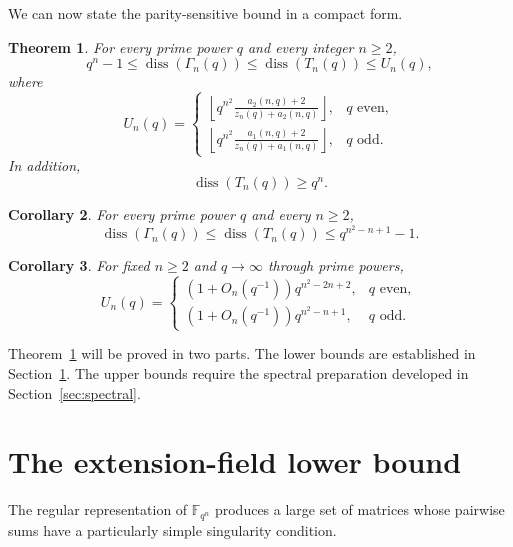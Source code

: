 \documentclass[11pt]{article}
\newtheorem{theorem}{Theorem}[section]
\newtheorem{corollary}[theorem]{Corollary}
\theoremstyle{definition}
\DeclareMathOperator{\diss}{diss}
\newcommand{\F}{\mathbb{F}}
\begin{document}

We can now state the parity-sensitive bound in a compact form.

\begin{theorem}\label{thm:main}
For every prime power $q$ and every integer $n\ge2$,
\[
  q^n-1\leq\diss(\Gamma_n(q))\leq\diss(T_n(q))\leq U_n(q),
\]
where
\begin{equation}\label{eq:U-definition}
U_n(q)=
\begin{cases}
\displaystyle
\left\lfloor q^{n^2}
\frac{a_2(n,q)+2}{z_n(q)+a_2(n,q)}\right\rfloor,
&q\text{ even},\\[1.2em]
\displaystyle
\left\lfloor q^{n^2}
\frac{a_1(n,q)+2}{z_n(q)+a_1(n,q)}\right\rfloor,
&q\text{ odd}.
\end{cases}
\end{equation}
In addition,
\[
  \diss(T_n(q))\ge q^n.
\]
\end{theorem}

\begin{corollary}\label{cor:uniform}
For every prime power $q$ and every $n\ge2$,
\[
  \diss(\Gamma_n(q))\le\diss(T_n(q))
  \le q^{n^2-n+1}-1.
\]
\end{corollary}

\begin{corollary}\label{cor:asymptotic}
For fixed $n\ge2$ and $q\to\infty$ through prime powers,
\[
 U_n(q)=
 \begin{cases}
 (1+O_n(q^{-1}))q^{n^2-2n+2},&q\text{ even},\\
 (1+O_n(q^{-1}))q^{n^2-n+1},&q\text{ odd}.
 \end{cases}
\]
\end{corollary}

Theorem~\ref{thm:main} will be proved in two parts.  The lower bounds are
established in Section~\ref{sec:lower}.  The upper bounds require the
spectral preparation developed in Section~\ref{sec:spectral}.

\section{The extension-field lower bound}\label{sec:lower}

The regular representation of $\F_{q^n}$ produces a large set of matrices
whose pairwise sums have a particularly simple singularity condition.
\end{document}

